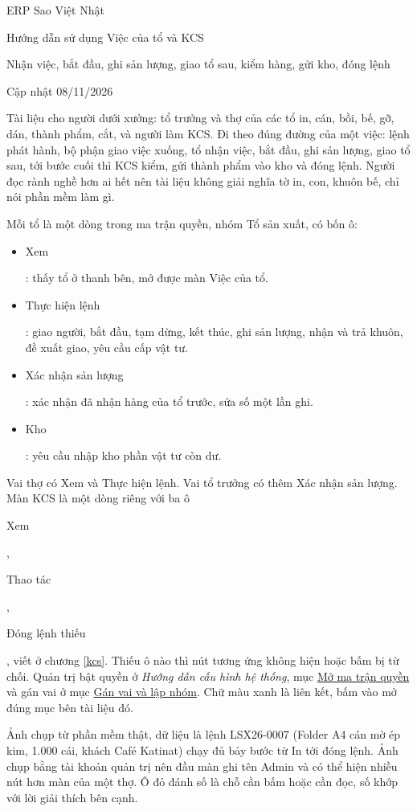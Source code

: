 \documentclass[11pt,a4paper]{article}
\newcommand{\oo}[1]{{\setlength{\fboxsep}{1.2pt}\colorbox{vang}{\strut #1}}}
\newcommand{\tl}[1]{\textit{#1}}
\newcommand{\cauhinh}{../huong-dan-cau-hinh/cau-hinh-he-thong.pdf}
\newcommand{\kbn}[2]{\href{\cauhinh\##1}{\textcolor{lienket}{#2}}}
\newcommand{\kb}[2]{\tl{Hướng dẫn cấu hình hệ thống}, mục \kbn{#1}{#2}}
\begin{document}
\thispagestyle{empty}
{\tieude\small\color{xamchu} ERP Sao Việt Nhật}\par\vspace{3pt}
{\tieude\fontsize{22}{26}\selectfont Hướng dẫn sử dụng Việc của tổ và KCS}\par\vspace{4pt}
{\small Nhận việc, bắt đầu, ghi sản lượng, giao tổ sau, kiểm hàng, gửi kho, đóng lệnh}\par\vspace{2pt}
{\small\color{xamchu} Cập nhật 08/11/2026}\par\vspace{6pt}
\noindent{\color{black!25}\rule{\linewidth}{0.4pt}}\par\vspace{4pt}

Tài liệu cho người dưới xưởng: tổ trưởng và thợ của các tổ in, cán, bồi, bế, gỡ, dán, thành phẩm, cắt, và người
làm KCS. Đi theo đúng đường của một việc: lệnh phát hành, bộ phận giao việc xuống, tổ nhận việc, bắt đầu, ghi sản lượng, giao tổ sau,
tới bước cuối thì KCS kiểm, gửi thành phẩm vào kho và đóng lệnh. Người đọc rành nghề hơn ai hết nên tài liệu
không giải nghĩa tờ in, con, khuôn bế, chỉ nói phần mềm làm gì.

Mỗi tổ là một dòng trong ma trận quyền, nhóm Tổ sản xuất, có bốn ô:

\begin{itemize}
\item \oo{Xem}: thấy tổ ở thanh bên, mở được màn Việc của tổ.
\item \oo{Thực hiện lệnh}: giao người, bắt đầu, tạm dừng, kết thúc, ghi sản lượng, nhận và trả khuôn, đề xuất giao,
yêu cầu cấp vật tư.
\item \oo{Xác nhận sản lượng}: xác nhận đã nhận hàng của tổ trước, sửa số một lần ghi.
\item \oo{Kho}: yêu cầu nhập kho phần vật tư còn dư.
\end{itemize}

Vai thợ có Xem và Thực hiện lệnh. Vai tổ trưởng có thêm Xác nhận sản lượng. Màn KCS là một dòng riêng với ba ô
\oo{Xem}, \oo{Thao tác}, \oo{Đóng lệnh thiếu}, viết ở chương \ref{kcs}. Thiếu ô nào thì nút tương ứng không hiện
hoặc bấm bị từ chối. Quản trị bật quyền ở \kb{phan-quyen-ma-tran}{Mở ma trận quyền} và gán vai ở mục
\kbn{phan-quyen-gan-vai}{Gán vai và lập nhóm}. Chữ màu xanh là liên kết, bấm vào mở đúng mục bên tài liệu đó.

Ảnh chụp từ phần mềm thật, dữ liệu là lệnh LSX26-0007 (Folder A4 cán mờ ép kim, 1.000 cái, khách Café Katinat)
chạy đủ bảy bước từ In tới đóng lệnh. Ảnh chụp bằng tài khoản quản trị nên đầu màn ghi tên Admin và có thể hiện
nhiều nút hơn màn của một thợ. Ô đỏ đánh số là chỗ cần bấm hoặc cần đọc, số khớp với lời giải thích bên cạnh.
\end{document}
